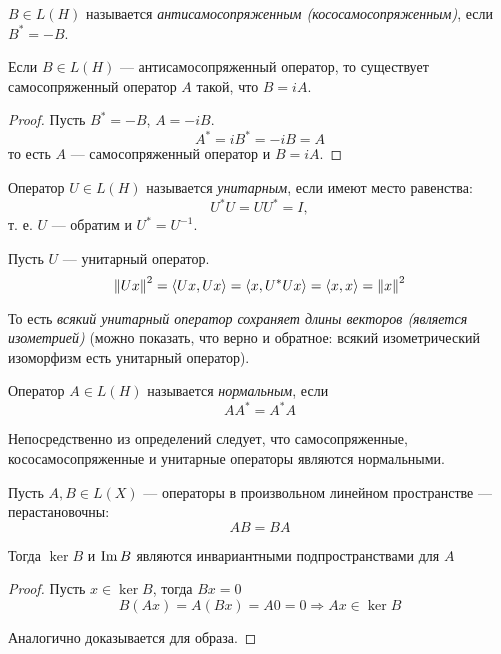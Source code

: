 \begin{definition}
    $B \in L(H)$ называется \emph{антисамосопряженным (кососамосопряженным)},
    если $B^* = -B$.
\end{definition}

\begin{lemma}
    Если $B \in L(H)$ — антисамосопряженный оператор, то существует
    самосопряженный оператор $A$ такой, что $B = iA$.    
\end{lemma}

\begin{proof}
    Пусть $B^* = -B$, $A = -i B$.
    \[ A^* = i B^* = -iB = A \]
    то есть $A$ — самосопряженный оператор и $B = iA$.
\end{proof}

\begin{definition}
    Оператор $U \in L(H)$ называется \emph{унитарным}, если имеют место равенства:
    \[ U^* U = UU^* = I, \]
    т. е. $U$ — обратим и $U^* = U^{-1}$.
\end{definition}

Пусть $U$ — унитарный оператор.
\[ \left\|Ux\right\|^2 = \langle Ux, Ux \rangle = \langle x, U^* Ux\rangle = \langle
x, x \rangle = \left\|x\right\|^2 \]

То есть \emph{всякий унитарный оператор сохраняет длины векторов (является
изометрией)} (можно показать, что верно и обратное: всякий изометрический
изоморфизм есть унитарный оператор).

\begin{definition}
    Оператор $A \in L(H)$ называется \emph{нормальным}, если
    \[ AA^* = A^* A \]
\end{definition}

Непосредственно из определений следует, что самосопряженные, кососамосопряженные
и унитарные операторы являются нормальными.

\begin{lemma}\label{lemma:invariantcommute}
    Пусть $A, B \in L(X)$ — операторы в произвольном линейном пространстве — перастановочны:
    \[ AB = BA \]

    Тогда $\ker B$ и $\operatorname{Im} B$ являются инвариантными подпространствами для
    $A$
\end{lemma}

\begin{proof}
    Пусть $x \in \ker B$, тогда $Bx = 0$
    \[ B(Ax) = A(Bx) = A0 = 0 \Rightarrow Ax \in \ker B \]

    Аналогично доказывается для образа.
\end{proof}


